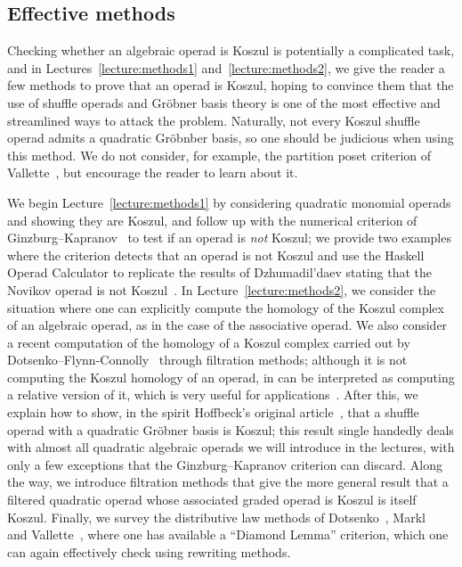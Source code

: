 \subsection{Effective methods}

Checking whether an algebraic operad is
Koszul is potentially a complicated task,
and in Lectures~\ref{lecture:methods1} 
and~\ref{lecture:methods2}, we give the reader
a few methods to prove that an operad is Koszul,
hoping to convince them that the use of shuffle
operads and Gr\"obner basis theory is one of 
the most effective and streamlined ways to 
attack the problem. Naturally, not every
Koszul shuffle operad admits a quadratic
Gr\"obnber basis, so one should be judicious
when using this method. We do not consider,
for example, the partition poset criterion
of Vallette~\cite{Vallette2007}, but encourage
the reader to learn about it.

We begin Lecture~\ref{lecture:methods1} 
by considering quadratic monomial operads and 
showing they are Koszul, and follow up with 
the numerical criterion
of Ginzburg--Kapranov~\cite{Ginzburg1994}
to test if an operad is \emph{not} Koszul; we
provide two examples where the criterion detects
that an operad is not Koszul and
use the \textsf{Haskell Operad
Calculator} to replicate the results of Dzhumadil'daev
stating that the Novikov operad is not 
Koszul~\cite{Dzhumadildaev2009}.
In Lecture~\ref{lecture:methods2}, 
we consider the situation where one
can explicitly compute the homology of the
Koszul complex of an algebraic operad,
as in the case of the associative operad.
We also consider a recent computation
of the homology of a Koszul complex 
carried out by Dotsenko--Flynn-Connolly~\cite{Dotsenko2020Schur}
through filtration methods; although it is
not computing the Koszul homology of an operad,
in can be interpreted as computing a
relative version of it, which is very useful
for applications~\cite{DotsenkoTamaroff2020}. 
After this, we explain how to show, in the
spirit Hoffbeck's original article~\cite{Hoffbeck2009},
that a shuffle operad with a quadratic
Gr\"obner basis is Koszul; this result
single handedly deals with almost all 
quadratic algebraic operads we will introduce
in the lectures, with only a few exceptions
that the Ginzburg--Kapranov criterion can
discard. Along the way, we introduce filtration
methods that give the more general result that
a filtered quadratic operad whose associated
graded operad is Koszul is itself Koszul.
Finally, we survey the distributive law methods
of Dotsenko~\cite{Dotsenko2007}, Markl~\cite{MarklDistributive}
and Vallette~\cite{Vallette2004}, where one
has available a ``Diamond Lemma'' criterion,
which one can again effectively check using
rewriting methods. 

